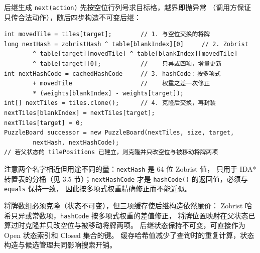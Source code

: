 后继生成 \texttt{next(action)} 先按空位行列号求目标格，越界即抛异常
（调用方保证只传合法动作），随后四步构造不可变后继：

\par\noindent\begin{minipage}{\linewidth}
\par\vspace{2bp}
{\fontsize{9.5bp}{12bp}\selectfont
\noindent\begin{minipage}{\linewidth}
\begin{verbatim}
int movedTile = tiles[target];        // 1. 与空位交换的将牌
long nextHash = zobristHash ^ table[blankIndex][0]     // 2. Zobrist
        ^ table[target][movedTile] ^ table[blankIndex][movedTile]
        ^ table[target][0];           //    只异或四项，增量更新
int nextHashCode = cachedHashCode     // 3. hashCode：按多项式
        + movedTile                   //    权重之差一次修正
        * (weights[blankIndex] - weights[target]);
int[] nextTiles = tiles.clone();      // 4. 克隆后交换，再封装
nextTiles[blankIndex] = nextTiles[target];
nextTiles[target] = 0;
PuzzleBoard successor = new PuzzleBoard(nextTiles, size, target,
        nextHash, nextHashCode);
// 若父状态的 tilePositions 已建立，则克隆并只改空位与被移动将牌两项
\end{verbatim}
\end{minipage}}
\end{minipage}\par

注意两个名字相近但用途不同的量：\texttt{nextHash} 是 64 位 Zobrist 值，
只用于 IDA* 转置表的分桶（见 3.5 节）；\texttt{nextHashCode} 才是
\texttt{hashCode()} 的返回值，必须与 \texttt{equals} 保持一致，
因此按多项式权重精确修正而不能近似。

将牌数组必须克隆（状态不可变），但三项缓存使后继构造依然廉价：
Zobrist 哈希只异或常数项，\texttt{hashCode} 按多项式权重的差值修正，
将牌位置映射在父状态已算过时克隆并只改空位与被移动将牌两项。
后继状态保持不可变，可直接作为 Open 状态索引和 Closed 集合的键。
缓存哈希值减少了查询时的重复计算，状态构造与候选管理共同影响搜索开销。

\par\vspace{2bp}

